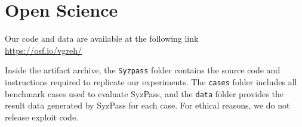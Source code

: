 \section*{Open Science}
Our code and data are available at the following link \\ \url{https://osf.io/vgreh/}

Inside the artifact archive, the \texttt{Syzpass} folder contains the source code and instructions required to replicate our experiments. The \texttt{cases} folder includes all benchmark cases used to evaluate SyzPass, and the \texttt{data} folder provides the result data generated by SyzPass for each case. For ethical reasons, we do not release exploit code.

